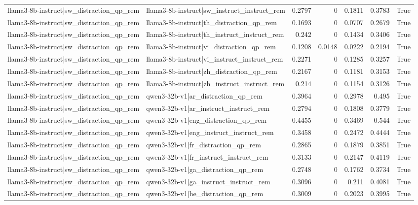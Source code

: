 \begin{table}
\begin{tabular}{l l r r r r l}
llama3-8b-instruct|sw_distraction_qp_rem & llama3-8b-instruct|sw_instruct_instruct_rem & 0.2797 & 0 & 0.1811 & 0.3783 & True \\
llama3-8b-instruct|sw_distraction_qp_rem & llama3-8b-instruct|th_distraction_qp_rem & 0.1693 & 0 & 0.0707 & 0.2679 & True \\
llama3-8b-instruct|sw_distraction_qp_rem & llama3-8b-instruct|th_instruct_instruct_rem & 0.242 & 0 & 0.1434 & 0.3406 & True \\
llama3-8b-instruct|sw_distraction_qp_rem & llama3-8b-instruct|vi_distraction_qp_rem & 0.1208 & 0.0148 & 0.0222 & 0.2194 & True \\
llama3-8b-instruct|sw_distraction_qp_rem & llama3-8b-instruct|vi_instruct_instruct_rem & 0.2271 & 0 & 0.1285 & 0.3257 & True \\
llama3-8b-instruct|sw_distraction_qp_rem & llama3-8b-instruct|zh_distraction_qp_rem & 0.2167 & 0 & 0.1181 & 0.3153 & True \\
llama3-8b-instruct|sw_distraction_qp_rem & llama3-8b-instruct|zh_instruct_instruct_rem & 0.214 & 0 & 0.1154 & 0.3126 & True \\
llama3-8b-instruct|sw_distraction_qp_rem & qwen3-32b-v1|ar_distraction_qp_rem & 0.3964 & 0 & 0.2978 & 0.495 & True \\
llama3-8b-instruct|sw_distraction_qp_rem & qwen3-32b-v1|ar_instruct_instruct_rem & 0.2794 & 0 & 0.1808 & 0.3779 & True \\
llama3-8b-instruct|sw_distraction_qp_rem & qwen3-32b-v1|eng_distraction_qp_rem & 0.4455 & 0 & 0.3469 & 0.544 & True \\
llama3-8b-instruct|sw_distraction_qp_rem & qwen3-32b-v1|eng_instruct_instruct_rem & 0.3458 & 0 & 0.2472 & 0.4444 & True \\
llama3-8b-instruct|sw_distraction_qp_rem & qwen3-32b-v1|fr_distraction_qp_rem & 0.2865 & 0 & 0.1879 & 0.3851 & True \\
llama3-8b-instruct|sw_distraction_qp_rem & qwen3-32b-v1|fr_instruct_instruct_rem & 0.3133 & 0 & 0.2147 & 0.4119 & True \\
llama3-8b-instruct|sw_distraction_qp_rem & qwen3-32b-v1|ga_distraction_qp_rem & 0.2748 & 0 & 0.1762 & 0.3734 & True \\
llama3-8b-instruct|sw_distraction_qp_rem & qwen3-32b-v1|ga_instruct_instruct_rem & 0.3096 & 0 & 0.211 & 0.4081 & True \\
llama3-8b-instruct|sw_distraction_qp_rem & qwen3-32b-v1|he_distraction_qp_rem & 0.3009 & 0 & 0.2023 & 0.3995 & True \\

\end{tabular}
\end{table}
